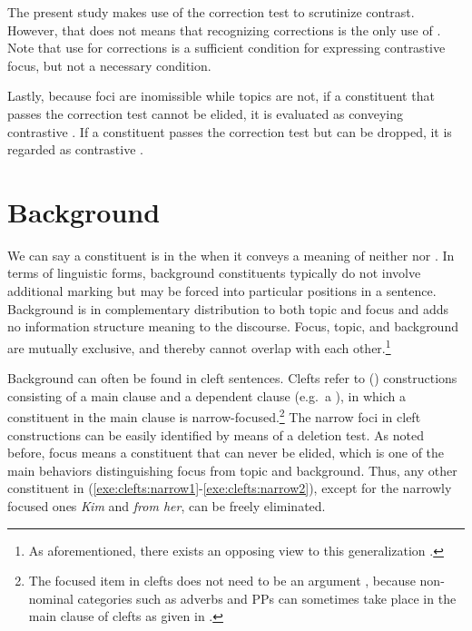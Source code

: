 The present study makes use of the correction test to scrutinize
contrast.  However, that does not means that recognizing corrections
is the only use of . Note that use for corrections is
a sufficient condition for expressing contrastive focus, but not a
necessary condition.


Lastly, because foci are inomissible while topics are not, if a
constituent that passes the correction test cannot be
elided, it is evaluated as conveying contrastive
.  If a constituent passes the correction test but can be
dropped, it is regarded as contrastive .








\section{Background}
\label{3:sec:background}


We can say a constituent is in the  when it conveys a
meaning of neither  nor .  In terms of linguistic forms,
background constituents typically do not involve additional marking
but may be forced into particular positions in a sentence. Background
is in complementary distribution to both topic and focus and adds no
information structure meaning to the discourse. Focus, topic, and
background are mutually exclusive, and thereby cannot overlap with
each other.\footnote{As aforementioned, there exists an opposing view
  to this generalization \citep{krifka:08}.}



Background can often be found in cleft
sentences. Clefts refer to ()
constructions consisting of a main clause and a dependent clause
(e.g.\ a ), in which a constituent in the main
clause is narrow-focused.\footnote{The focused item in clefts does not
  need to be an argument , because non-nominal categories such as
  adverbs and PPs can sometimes take place in the main clause of
  clefts as given in .}  The narrow foci in
cleft constructions can be easily identified by means of a deletion
test. As noted before, focus means a constituent
that can never be elided, which is one of the main behaviors
distinguishing focus from topic and background. Thus, any other
constituent in (\ref{exe:clefts:narrow1}-\ref{exe:clefts:narrow2}),
except for the narrowly focused ones \textit{Kim} and \textit{from
  her}, can be freely eliminated.

